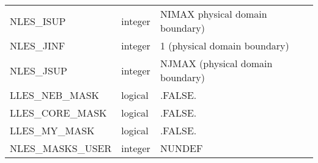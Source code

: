 \begin{longtable} {|p{}|p{}|p{}|}
NLES\_ISUP                    & integer           & NIMAX physical domain boundary) \\
NLES\_JINF                    & integer           & 1 (physical domain boundary) \\
NLES\_JSUP                    & integer           & NJMAX (physical domain boundary) \\
LLES\_NEB\_MASK               & logical           & .FALSE. \\
LLES\_CORE\_MASK              & logical           & .FALSE. \\
LLES\_MY\_MASK                & logical           & .FALSE. \\
NLES\_MASKS\_USER             & integer           & NUNDEF \\
\end{longtable}

